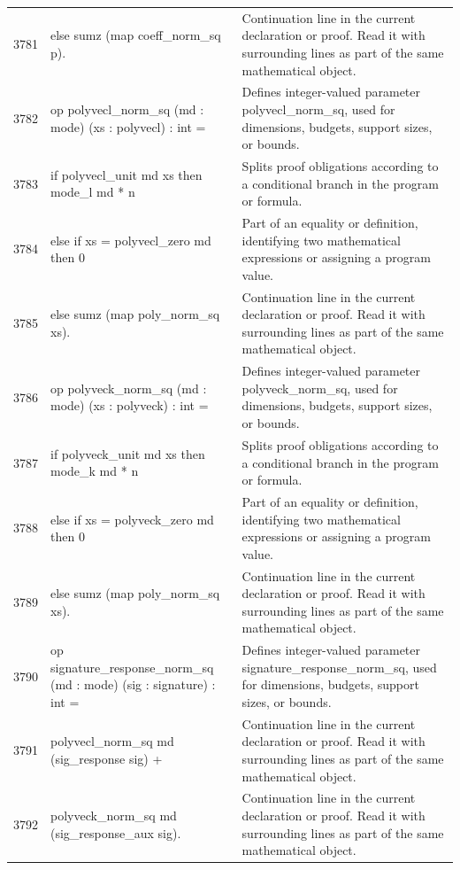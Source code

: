 \documentclass[10pt]{article}
\begin{document}
\begin{longtable}{r L{0.53\textwidth} L{0.37\textwidth}}
3781 & {\ttfamily\scriptsize   else sumz (map coeff\_norm\_sq p).} & Continuation line in the current declaration or proof.  Read it with surrounding lines as part of the same mathematical object. \\
3782 & {\ttfamily\scriptsize op polyvecl\_norm\_sq (md : mode) (xs : polyvecl) : int =} & Defines integer-valued parameter polyvecl\_norm\_sq, used for dimensions, budgets, support sizes, or bounds. \\
3783 & {\ttfamily\scriptsize   if polyvecl\_unit md xs then mode\_l md * n} & Splits proof obligations according to a conditional branch in the program or formula. \\
3784 & {\ttfamily\scriptsize   else if xs = polyvecl\_zero md then 0} & Part of an equality or definition, identifying two mathematical expressions or assigning a program value. \\
3785 & {\ttfamily\scriptsize   else sumz (map poly\_norm\_sq xs).} & Continuation line in the current declaration or proof.  Read it with surrounding lines as part of the same mathematical object. \\
3786 & {\ttfamily\scriptsize op polyveck\_norm\_sq (md : mode) (xs : polyveck) : int =} & Defines integer-valued parameter polyveck\_norm\_sq, used for dimensions, budgets, support sizes, or bounds. \\
3787 & {\ttfamily\scriptsize   if polyveck\_unit md xs then mode\_k md * n} & Splits proof obligations according to a conditional branch in the program or formula. \\
3788 & {\ttfamily\scriptsize   else if xs = polyveck\_zero md then 0} & Part of an equality or definition, identifying two mathematical expressions or assigning a program value. \\
3789 & {\ttfamily\scriptsize   else sumz (map poly\_norm\_sq xs).} & Continuation line in the current declaration or proof.  Read it with surrounding lines as part of the same mathematical object. \\
3790 & {\ttfamily\scriptsize op signature\_response\_norm\_sq (md : mode) (sig : signature) : int =} & Defines integer-valued parameter signature\_response\_norm\_sq, used for dimensions, budgets, support sizes, or bounds. \\
3791 & {\ttfamily\scriptsize   polyvecl\_norm\_sq md (sig\_response sig) +} & Continuation line in the current declaration or proof.  Read it with surrounding lines as part of the same mathematical object. \\
3792 & {\ttfamily\scriptsize   polyveck\_norm\_sq md (sig\_response\_aux sig).} & Continuation line in the current declaration or proof.  Read it with surrounding lines as part of the same mathematical object. \\

\end{longtable}
\end{document}
